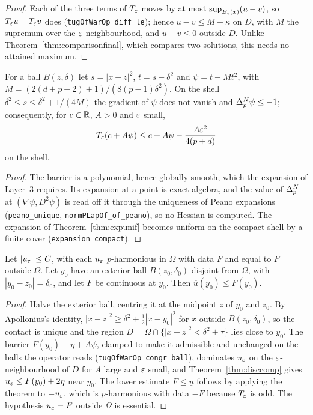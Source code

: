 \begin{proof}
\leanok
{}
Each of the three terms of $T_\varepsilon$ moves by at most $\sup_{B_\varepsilon(x)}(u - v)$, so
$T_\varepsilon u - T_\varepsilon v$ does (\texttt{tugOfWarOp\_diff\_le}); hence
$u - v \le M - \kappa$ on $D$, with $M$ the supremum over the
$\varepsilon$-neighbourhood, and $u - v \le 0$ outside $D$. Unlike
Theorem~\ref{thm:comparisonfinal}, which compares two solutions, this needs no
attained maximum.
\end{proof}


\begin{theorem}\label{thm:barrier}
\leanok
For a ball $B(z, \delta)$ let $s = |x - z|^2$, $t = s - \delta^2$ and
$\psi = t - M t^2$, with $M = (2(d + p - 2) + 1)/(8(p - 1)\delta^2)$. On the
shell $\delta^2 \le s \le \delta^2 + 1/(4M)$ the gradient of $\psi$ does not
vanish and $\Delta_p^{N} \psi \le -1$; consequently, for $c \in \mathbb{R}$, $A > 0$ and
$\varepsilon$ small,
\[
  T_\varepsilon(c + A\psi) \le c + A\psi - \frac{A\varepsilon^2}{4(p + d)}
\]
on the shell.
\end{theorem}

\begin{proof}
\leanok
{}
The barrier is a polynomial, hence globally smooth, which the expansion of
Layer~3 requires. Its expansion at a point is
exact algebra, and the value of $\Delta_p^{N}$ at $(\nabla\psi, D^2\psi)$ is read off it
through the uniqueness of Peano expansions (\texttt{peano\_unique},
\texttt{normPLapOf\_of\_peano}), so no Hessian is computed. The expansion of Theorem~\ref{thm:expunif} becomes
uniform on the compact shell by a finite cover (\texttt{expansion\_compact}).
\end{proof}


\begin{theorem}\label{thm:bdry}
\leanok
Let $|u_\varepsilon| \le C$, with each $u_\varepsilon$ $p$-harmonious in $\Omega$ with data
$F$ and equal to $F$ outside $\Omega$. Let $y_0$ have an exterior ball
$B(z_0, \delta_0)$ disjoint from $\Omega$, with $|y_0 - z_0| = \delta_0$, and let
$F$ be continuous at $y_0$. Then $\overline u(y_0) \le F(y_0)$.
\end{theorem}

\begin{proof}
\leanok
{}
Halve the exterior ball, centring it at the midpoint $z$ of $y_0$ and $z_0$. By
Apollonius's identity,
$|x - z|^2 \ge \delta^2 + \tfrac12|x - y_0|^2$ for $x$ outside $B(z_0, \delta_0)$,
so the contact is unique and the region
$D = \Omega \cap \{|x - z|^2 < \delta^2 + \tau\}$ lies close to $y_0$. The
barrier $F(y_0) + \eta + A\psi$, clamped to make it admissible and unchanged on
the balls the operator reads (\texttt{tugOfWarOp\_congr\_ball}), dominates
$u_\varepsilon$ on the $\varepsilon$-neighbourhood of $D$ for $A$ large and $\varepsilon$ small, and
Theorem~\ref{thm:disccomp} gives $u_\varepsilon \le F(y_0) + 2\eta$ near $y_0$. The lower
estimate $F \le \underline u$ follows by applying the theorem to $-u_\varepsilon$, which
is $p$-harmonious with data $-F$ because $T_\varepsilon$ is odd. The hypothesis
$u_\varepsilon = F$ outside $\Omega$ is essential.
\end{proof}


